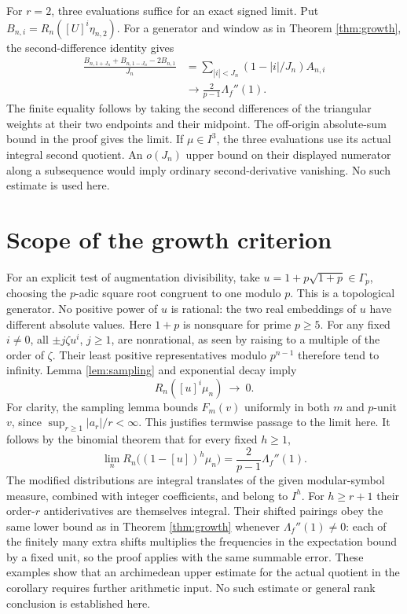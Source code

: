 \documentclass[11pt]{article}
\begin{document}
For \(r=2\), three evaluations suffice for an exact signed limit.
Put \(B_{n,i}=R_n([U]^i\eta_{n,2})\). For a generator and window as in
Theorem \ref{thm:growth}, the second-difference identity gives
\begin{align*}
 \frac{B_{n,1+J_n}+B_{n,1-J_n}-2B_{n,1}}{J_n}
 &=\sum_{|i|<J_n}(1-|i|/J_n) A_{n,i}\\
 &\longrightarrow \frac{2}{p-1}\Lambda_f''(1).
\end{align*}
The finite equality follows by taking the second differences of the
triangular weights at their two endpoints and their midpoint. The
off-origin absolute-sum bound in the proof gives the limit. If
\(\mu\in I^3\), the three evaluations use its actual integral
second quotient. An \(o(J_n)\) upper bound on their displayed
numerator along a subsequence would imply ordinary second-derivative
vanishing. No such estimate is used here.

\section{Scope of the growth criterion}

For an explicit test of augmentation divisibility, take
\(u=1+p\sqrt{1+p}\in\Gamma_p\), choosing the \(p\)-adic square root
congruent to one modulo \(p\). This is a topological generator.
No positive power of \(u\) is rational: the two real embeddings of
\(u\) have different absolute values. Here \(1+p\) is nonsquare
for prime \(p\ge5\). For any fixed \(i\ne0\), all
\(\pm j\zeta u^i\), \(j\ge1\), are nonrational, as seen by raising
to a multiple of the order of \(\zeta\).
Their least positive representatives modulo \(p^{n-1}\) therefore
tend to infinity. Lemma \ref{lem:sampling} and exponential decay
imply
\[
 R_n([u]^i\mu_n)\ \longrightarrow\ 0 .
\]
For clarity, the sampling lemma bounds \(F_m(v)\) uniformly in both
\(m\) and \(p\)-unit \(v\), since
\(\sup_{r\ge1}|a_r|/r<\infty\). This justifies termwise passage to
the limit here. It follows by the binomial theorem that for every
fixed \(h\ge1\),
\[
 \lim_n R_n\big((1-[u])^h\mu_n\big)
    =\frac{2}{p-1}\Lambda_f''(1).
\]
The modified distributions are integral translates of the given
modular-symbol measure, combined with integer coefficients, and
belong to \(I^h\). For \(h\ge r+1\) their order-\(r\)
antiderivatives are themselves integral. Their shifted pairings
obey the same lower bound as in Theorem \ref{thm:growth} whenever
\(\Lambda_f''(1)\ne0\): each of the finitely many extra shifts
multiplies the frequencies in the expectation bound by a fixed unit,
so the proof applies with the same summable error. These examples show that
an archimedean upper estimate for the actual quotient in the corollary
requires further arithmetic input. No such estimate or general
rank conclusion is established here.
\end{document}
